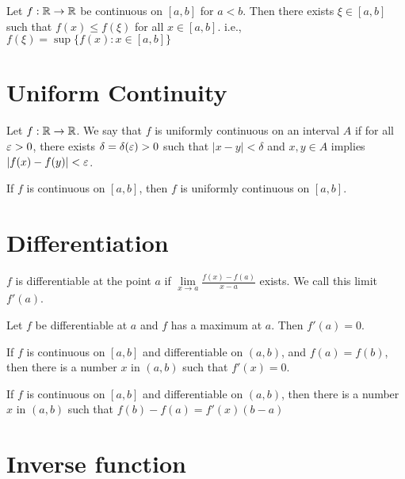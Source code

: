 \begin{theorem*}
  Let $f : \mathbb R \to \mathbb R$ be continuous on $[a, b]$ for $a < b$. Then there exists $\xi \in [a, b]$ such that $f(x) \le f(\xi)$ for all $x \in [a, b]$.
  i.e., $f(\xi) = \sup \{f(x) : x \in [a, b]\}$
\end{theorem*}

\section*{Uniform Continuity}

\begin{definition*}
  Let $f : \mathbb R \to \mathbb R$.
  We say that $f$ is uniformly continuous on an interval $A$ if for all $\varepsilon > 0$, there exists $\delta = \delta(\varepsilon) > 0$ such that
  $|x-y| < \delta$ and $x, y \in A$ implies $|f(x)-f(y)| < \varepsilon$.
\end{definition*}

\begin{theorem*}
  If $f$ is continuous on $[a, b]$, then $f$ is uniformly continuous on $[a, b]$.
\end{theorem*}

\section*{Differentiation}

\begin{definition*}
  $f$ is differentiable at the point $a$ if $\lim\limits_{x \to a} \frac{f(x)-f(a)}{x-a}$ exists. We call this limit $f'(a)$.
\end{definition*}

\begin{theorem*}
  Let $f$ be differentiable at $a$ and $f$ has a maximum at $a$. Then $f'(a) = 0$. 
\end{theorem*}

\begin{theorem*}
  If $f$ is continuous on $[a,b]$ and differentiable on $(a, b)$, and $f(a) = f(b)$, then
  there is a number $x$ in $(a, b)$ such that $f'(x) = 0$.
\end{theorem*}

\begin{theorem*}
  If $f$ is continuous on $[a,b]$ and differentiable on $(a, b)$, then there is a number $x$ in $(a, b)$ such that
    $f(b) - f(a) = f'(x)(b-a)$
\end{theorem*}

\section*{Inverse function}

